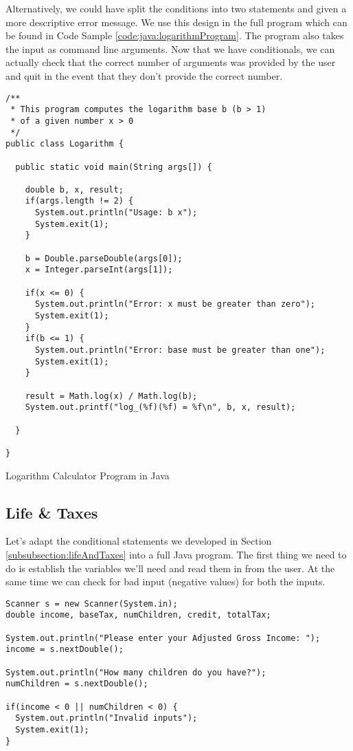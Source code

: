 Alternatively, we could have split the conditions into two statements and given
a more descriptive error message.  We use this design in the full program 
which can be found in Code Sample \ref{code:java:logarithmProgram}.  The 
program also takes the input as command line arguments.  Now that we have
conditionals, we can actually check that the correct number of arguments
was provided by the user and quit in the event that they don't provide
the correct number.

\begin{listing}[h]
\begin{verbatim}
/**
 * This program computes the logarithm base b (b > 1) 
 * of a given number x > 0
 */
public class Logarithm {

  public static void main(String args[]) {

    double b, x, result;
    if(args.length != 2) {
      System.out.println("Usage: b x");
      System.exit(1);
    }  
	  
    b = Double.parseDouble(args[0]);
    x = Integer.parseInt(args[1]);

    if(x <= 0) {
      System.out.println("Error: x must be greater than zero");
      System.exit(1);
    }
    if(b <= 1) {
      System.out.println("Error: base must be greater than one");
      System.exit(1);
    }

    result = Math.log(x) / Math.log(b);
    System.out.printf("log_(%f)(%f) = %f\n", b, x, result);

  }

}
\end{verbatim}
\caption{Logarithm Calculator Program in Java}
\label{code:java:logarithmProgram}
\end{listing}

\subsection{Life \& Taxes}

Let's adapt the conditional statements we developed in Section \ref{subsubsection:lifeAndTaxes}
into a full Java program.  The first thing we need to do is establish the variables we'll need and
read them in from the user.  At the same time we can check for bad input (negative values)
for both the inputs.

\begin{verbatim}
Scanner s = new Scanner(System.in);
double income, baseTax, numChildren, credit, totalTax;

System.out.println("Please enter your Adjusted Gross Income: ");
income = s.nextDouble();

System.out.println("How many children do you have?");
numChildren = s.nextDouble();

if(income < 0 || numChildren < 0) {
  System.out.println("Invalid inputs");   
  System.exit(1);
}
\end{verbatim}

